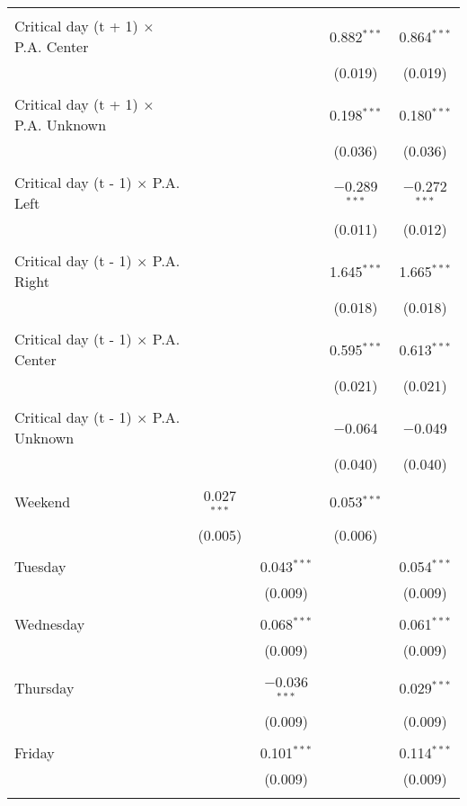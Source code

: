 \documentclass[
]{article}
\begin{document}
\begin{table}[!htbp]
{\begin{tabular}{@{\extracolsep{5pt}}lcccc}
  & & & & \\ 
 Critical day (t + 1) $\times$ P.A. Center &  &  & 0.882$^{***}$ & 0.864$^{***}$ \\ 
  &  &  & (0.019) & (0.019) \\ 
  & & & & \\ 
 Critical day (t + 1) $\times$ P.A. Unknown &  &  & 0.198$^{***}$ & 0.180$^{***}$ \\ 
  &  &  & (0.036) & (0.036) \\ 
  & & & & \\ 
 Critical day (t - 1) $\times$ P.A. Left &  &  & $-$0.289$^{***}$ & $-$0.272$^{***}$ \\ 
  &  &  & (0.011) & (0.012) \\ 
  & & & & \\ 
 Critical day (t - 1) $\times$ P.A. Right &  &  & 1.645$^{***}$ & 1.665$^{***}$ \\ 
  &  &  & (0.018) & (0.018) \\ 
  & & & & \\ 
 Critical day (t - 1) $\times$ P.A. Center &  &  & 0.595$^{***}$ & 0.613$^{***}$ \\ 
  &  &  & (0.021) & (0.021) \\ 
  & & & & \\ 
 Critical day (t - 1) $\times$ P.A. Unknown &  &  & $-$0.064 & $-$0.049 \\ 
  &  &  & (0.040) & (0.040) \\ 
  & & & & \\ 
 Weekend & 0.027$^{***}$ &  & 0.053$^{***}$ &  \\ 
  & (0.005) &  & (0.006) &  \\ 
  & & & & \\ 
 Tuesday &  & 0.043$^{***}$ &  & 0.054$^{***}$ \\ 
  &  & (0.009) &  & (0.009) \\ 
  & & & & \\ 
 Wednesday &  & 0.068$^{***}$ &  & 0.061$^{***}$ \\ 
  &  & (0.009) &  & (0.009) \\ 
  & & & & \\ 
 Thursday &  & $-$0.036$^{***}$ &  & 0.029$^{***}$ \\ 
  &  & (0.009) &  & (0.009) \\ 
  & & & & \\ 
 Friday &  & 0.101$^{***}$ &  & 0.114$^{***}$ \\ 
  &  & (0.009) &  & (0.009) \\ 
  & & & & \\ 

\end{tabular}}
\end{table}
\end{document}
